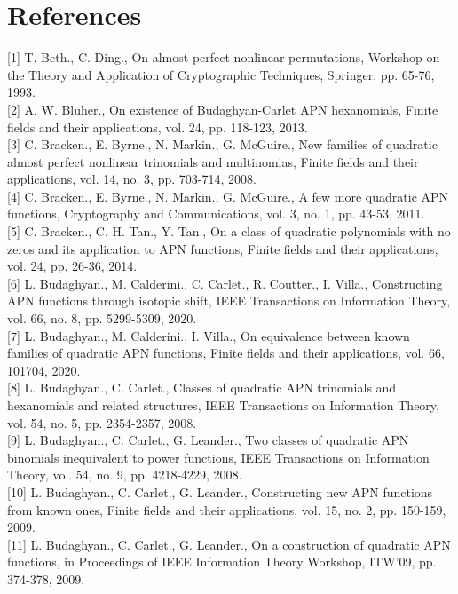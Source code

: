 \documentclass[10pt]{article}
\begin{document}
\section*{References}
[1] T. Beth., C. Ding., On almost perfect nonlinear permutations, Workshop on the Theory and Application of Cryptographic Techniques, Springer, pp. 65-76, 1993.\\[0pt]
[2] A. W. Bluher., On existence of Budaghyan-Carlet APN hexanomials, Finite fields and their applications, vol. 24, pp. 118-123, 2013.\\[0pt]
[3] C. Bracken., E. Byrne., N. Markin., G. McGuire., New families of quadratic almost perfect nonlinear trinomials and multinomias, Finite fields and their applications, vol. 14, no. 3, pp. 703-714, 2008.\\[0pt]
[4] C. Bracken., E. Byrne., N. Markin., G. McGuire., A few more quadratic APN functions, Cryptography and Communications, vol. 3, no. 1, pp. 43-53, 2011.\\[0pt]
[5] C. Bracken., C. H. Tan., Y. Tan., On a class of quadratic polynomials with no zeros and its application to APN functions, Finite fields and their applications, vol. 24, pp. 26-36, 2014.\\[0pt]
[6] L. Budaghyan., M. Calderini., C. Carlet., R. Coutter., I. Villa., Constructing APN functions through isotopic shift, IEEE Transactions on Information Theory, vol. 66, no. 8, pp. 5299-5309, 2020.\\[0pt]
[7] L. Budaghyan., M. Calderini., I. Villa., On equivalence between known families of quadratic APN functions, Finite fields and their applications, vol. 66, 101704, 2020.\\[0pt]
[8] L. Budaghyan., C. Carlet., Classes of quadratic APN trinomials and hexanomials and related structures, IEEE Transactions on Information Theory, vol. 54, no. 5, pp. 2354-2357, 2008.\\[0pt]
[9] L. Budaghyan., C. Carlet., G. Leander., Two classes of quadratic APN binomials inequivalent to power functions, IEEE Transactions on Information Theory, vol. 54, no. 9, pp. 4218-4229, 2008.\\[0pt]
[10] L. Budaghyan., C. Carlet., G. Leander., Constructing new APN functions from known ones, Finite fields and their applications, vol. 15, no. 2, pp. 150-159, 2009.\\[0pt]
[11] L. Budaghyan., C. Carlet., G. Leander., On a construction of quadratic APN functions, in Proceedings of IEEE Information Theory Workshop, ITW'09, pp. 374-378, 2009.\\[0pt]
\end{document}
